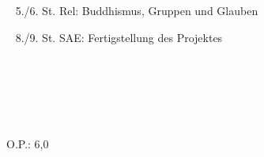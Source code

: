 {{	\textbullet~ 5./6. St. Rel: Buddhismus, Gruppen und Glauben\par
	\textbullet~ 8./9. St. SAE: Fertigstellung des Projektes\par
	\textbullet~ \par
	\textbullet~ \par
	\textbullet~ 
	}{}{O.P.: 6,0}
}{}
\Unterschrift
\newpage
